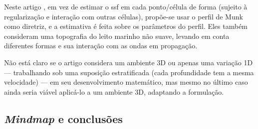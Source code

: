 
Neste artigo \cite{wu_inversion_2023}, em vez de estimar o \gls{ssf} em cada ponto/célula de forma  (sujeito à regularização e interação com outras células), propõe-se usar o perfil de Munk como diretriz, e a estimativa é feita sobre os parâmetros do perfil. Eles também consideram uma topografia do leito marinho não suave, levando em conta diferentes formas e sua interação com as ondas em propagação.

Não está claro se o artigo considera um ambiente 3D ou apenas uma variação 1D --- trabalhando sob uma suposição estratificada (cada profundidade tem a mesma velocidade) --- em seu desenvolvimento matemático, mas mesmo no último caso ainda seria viável aplicá-lo a um ambiente 3D, adaptando a formulação.

%
%
%



\subsection{\textsl{Mindmap} e conclusões}

